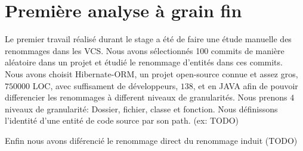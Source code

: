 \section{Première analyse à grain fin}
\label{sec:analyse_fin_grain}

Le premier travail réalisé durant le stage a été de faire une étude manuelle des renommages dans les VCS. Nous avons sélectionnés 100 commits de manière aléatoire dans un projet et étudié le renommage d'entités dans ces commits.\\
Nous avons choisit Hibernate-ORM, un projet open-source connue et assez gros, $750000$ LOC, avec suffisament de développeurs, $138$, et en JAVA afin de pouvoir differencier les renommages à different niveaux de granularités.
Nous prenons $4$ niveaux de granularité: Dossier, fichier, classe et fonction. Nous définissons l'identité d'une entité de code source par son path. (ex: TODO)

Enfin nous avons diférencié le renommage direct du renommage induit (TODO)\\

